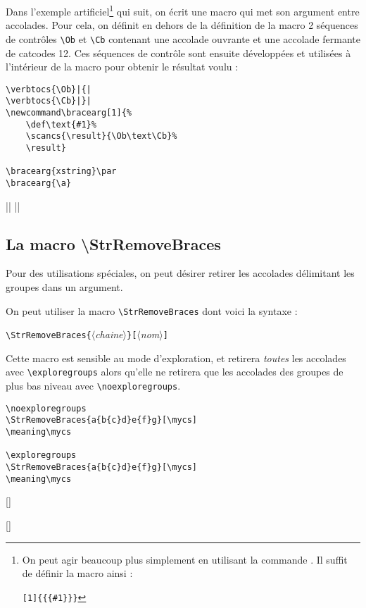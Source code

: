 \documentclass[a4paper,10pt]{article}
\newcommand\argu[1]{$\langle$\textit{#1}$\rangle$}
\newcommand\ARGU[1]{\texttt{\color{black}\{}\argu{#1}\texttt{\color{black}\}}}
\newcommand\arguC[1]{\texttt{\color{black}[}\argu{#1}\texttt{\color{black}]}}
\newcommand\styleexercice{\footnotesize}
\newcommand\verbinline{\lstinline[basicstyle=\normalsize\ttfamily]}
\begin{document}
Dans l'exemple artificiel\footnote{On peut agir beaucoup plus simplement en utilisant la commande \texttt{\string\detokenize}. Il suffit de définir la macro ainsi :\par\texttt{\string\newcommand\string\bracearg[1]\{\string\detokenize\{\{\#1\}\}\}}} qui suit, on écrit une macro qui met son argument entre accolades. Pour cela, on définit en dehors de la définition de la macro 2 séquences de contrôles \verb|\Ob| et \verb|\Cb| contenant une accolade ouvrante et une accolade fermante de catcodes 12. Ces séquences de contrôle sont ensuite développées et utilisées à l'intérieur de la macro pour obtenir le résultat voulu :\par\nobreak\medskip
\begin{minipage}[c]{0.65\linewidth}
\begin{lstlisting}
\verbtocs{\Ob}|{|
\verbtocs{\Cb}|}|
\newcommand\bracearg[1]{%
	\def\text{#1}%
	\scancs{\result}{\Ob\text\Cb}%
	\result}

\bracearg{xstring}\par
\bracearg{\a}
\end{lstlisting}%
\end{minipage}\hfill
\begin{minipage}[c]{0.35\linewidth}
	\styleexercice
	\verbtocs{\Ob}|{|
	\verbtocs{\Cb}|}|
	\newcommand\bracearg[1]{%
		\def\text{#1}%
		\scancs{\result}{\Ob\text\Cb}%
		\result}

	\bracearg{xstring}\par
	\bracearg{\a}
\end{minipage}%

\subsection{La macro \ttfamily\textbackslash StrRemoveBraces}
Pour des utilisations spéciales, on peut désirer retirer les accolades délimitant les groupes dans un argument.

On peut utiliser la macro \verbinline|\StrRemoveBraces| dont voici la syntaxe :\par\nobreak\smallskip
\verbinline|\StrRemoveBraces|\ARGU{chaine}\arguC{nom}
\smallskip

Cette macro est sensible au mode d'exploration, et retirera \emph{toutes} les accolades avec \verbinline|\exploregroups| alors qu'elle ne retirera que les accolades des groupes de plus bas niveau avec \verbinline|\noexploregroups|.\medskip

\begin{minipage}[c]{0.65\linewidth}
\begin{lstlisting}
\noexploregroups
\StrRemoveBraces{a{b{c}d}e{f}g}[\mycs]
\meaning\mycs

\exploregroups
\StrRemoveBraces{a{b{c}d}e{f}g}[\mycs]
\meaning\mycs
\end{lstlisting}%
\end{minipage}\hfill
\begin{minipage}[c]{0.35\linewidth}
	\styleexercice
	\noexploregroups
	[\mycs]
	\meaning\mycs

	\exploregroups
	[\mycs]
	\meaning\mycs
\end{minipage}%
\end{document}
